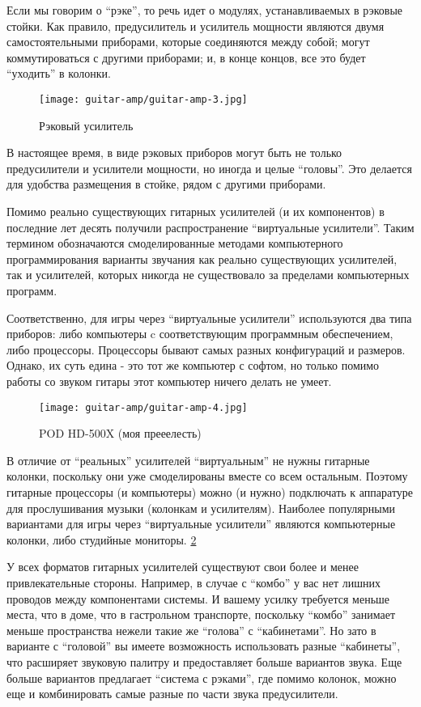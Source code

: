 Если мы говорим о “рэке”, то речь идет о модулях, устанавливаемых в рэковые стойки. Как правило, предусилитель и усилитель мощности являются двумя самостоятельными приборами, которые соединяются между собой; могут коммутироваться с другими приборами; и, в конце концов, все это будет “уходить” в колонки.
\begin{figure}[h]
\centering
\texttt{[image: guitar-amp/guitar-amp-3.jpg]}

\caption{Рэковый усилитель}
\label{guitar-amp:3}
\end{figure}

В настоящее время, в виде рэковых приборов могут быть не только предусилители и усилители мощности, но иногда и целые “головы”. Это делается для удобства размещения в стойке, рядом с другими приборами.

Помимо реально существующих гитарных усилителей (и их компонентов) в последние лет десять получили распространение “виртуальные усилители”. Таким термином обозначаются смоделированные методами компьютерного программирования варианты звучания как реально существующих усилителей, так и усилителей, которых никогда не существовало за пределами компьютерных программ.

Соответственно, для игры через “виртуальные усилители” используются два типа приборов: либо компьютеры c соответствующим программным обеспечением, либо процессоры. Процессоры бывают самых разных конфигураций и размеров. Однако, их суть едина - это тот же компьютер с софтом, но только помимо работы со звуком гитары этот компьютер ничего делать не умеет.
\begin{figure}[h]
\centering
\texttt{[image: guitar-amp/guitar-amp-4.jpg]}

\caption{POD HD-500X (моя прееелесть)}
\label{guitar-amp:POD-HD500X}
\end{figure}

В отличие от “реальных” усилителей “виртуальным” не нужны гитарные колонки, поскольку они уже смоделированы вместе со всем остальным. Поэтому гитарные процессоры (и компьютеры) можно (и нужно) подключать к аппаратуре для прослушивания музыки (колонкам и усилителям). Наиболее популярными вариантами для игры через “виртуальные усилители” являются компьютерные колонки, либо студийные мониторы. \ref{guitar-amp:POD-HD500X} %

У всех форматов гитарных усилителей существуют свои более и менее привлекательные стороны. Например, в случае с “комбо” у вас нет лишних проводов между компонентами системы. И вашему усилку требуется меньше места, что в доме, что в гастрольном транспорте, поскольку “комбо” занимает меньше пространства нежели такие же “голова” с “кабинетами”. Но зато в варианте с “головой” вы имеете возможность использовать разные “кабинеты”, что расширяет звуковую палитру и предоставляет больше вариантов звука. Еще больше вариантов предлагает “система с рэками”, где помимо колонок, можно еще и комбинировать самые разные по части звука предусилители.

